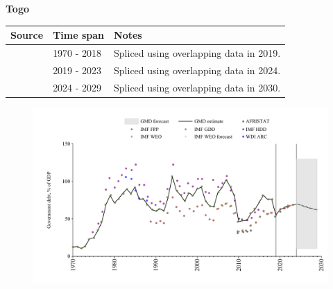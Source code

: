 \documentclass[12pt,a4paper,landscape]{article}
\begin{document}
\begin{adjustbox}{max totalsize={\paperwidth}{\paperheight},center}
\begin{minipage}[t][\textheight][t]{\textwidth}
\vspace*{0.5cm}
{}
\begin{center}
{\Large\bfseries Togo}
\end{center}
\vspace{0.5cm}
\begin{table}[H]
\centering
\small
\begin{tabular}{|l|l|l|}
\hline
\textbf{Source} & \textbf{Time span} & \textbf{Notes} \\
\hline
\rowcolor{white}\cite{IMF_GDD}& 1970 - 2018 &Spliced using overlapping data in 2019.\\
\rowcolor{lightgray}\cite{IMF_FPP}& 2019 - 2023 &Spliced using overlapping data in 2024.\\
\rowcolor{white}\cite{IMF_WEO_forecast}& 2024 - 2029 &Spliced using overlapping data in 2030.\\
\hline
\end{tabular}
\end{table}
\begin{figure}[H]
\centering
\includegraphics[width=\textwidth,height=0.6\textheight,keepaspectratio]{graphs/TGO_govdebt_GDP.pdf}
\end{figure}
\end{minipage}
\end{adjustbox}
\end{document}
